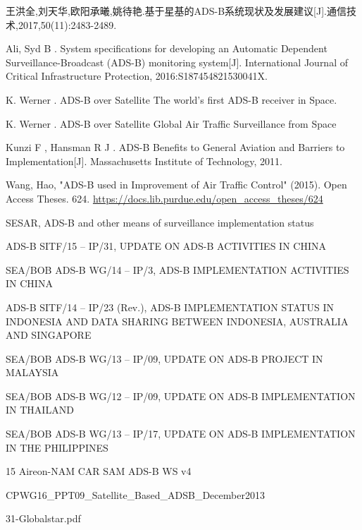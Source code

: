 
\begin{thebibliography}{99}

王洪全,刘天华,欧阳承曦,姚待艳.基于星基的ADS-B系统现状及发展建议[J].通信技术,2017,50(11):2483-2489.




 Ali, Syd B . System specifications for developing an Automatic Dependent Surveillance-Broadcast (ADS-B) monitoring system[J]. International Journal of Critical Infrastructure Protection, 2016:S187454821530041X.

 K. Werner . ADS-B over Satellite The world’s first ADS-B receiver in Space.

 K. Werner . ADS-B over Satellite Global Air Traffic Surveillance from Space

 Kunzi F , Hansman R J . ADS-B Benefits to General Aviation and Barriers to Implementation[J]. Massachusetts Institute of Technology, 2011.

 Wang, Hao, "ADS-B used in Improvement of Air Traffic Control" (2015). Open Access Theses. 624.
\url{https://docs.lib.purdue.edu/open_access_theses/624}

 SESAR, ADS-B and other means of surveillance implementation status

 ADS-B SITF/15 – IP/31, UPDATE ON ADS-B ACTIVITIES IN CHINA

 SEA/BOB ADS-B WG/14 – IP/3, ADS-B IMPLEMENTATION ACTIVITIES IN CHINA

 ADS-B SITF/14 – IP/23 (Rev.), ADS-B IMPLEMENTATION STATUS IN INDONESIA AND DATA SHARING BETWEEN INDONESIA, AUSTRALIA AND SINGAPORE

 SEA/BOB ADS-B WG/13 – IP/09, UPDATE ON ADS-B PROJECT IN MALAYSIA

 SEA/BOB ADS-B WG/12 – IP/09, UPDATE ON ADS-B IMPLEMENTATION IN THAILAND

 SEA/BOB ADS-B WG/13 – IP/17, UPDATE ON ADS-B IMPLEMENTATION IN THE PHILIPPINES

 15 Aireon-NAM CAR SAM ADS-B WS v4

 CPWG16\_PPT09\_Satellite\_Based\_ADSB\_December2013

 31-Globalstar.pdf


\end{thebibliography}
